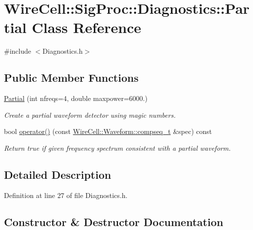 \hypertarget{class_wire_cell_1_1_sig_proc_1_1_diagnostics_1_1_partial}{}\section{Wire\+Cell\+:\+:Sig\+Proc\+:\+:Diagnostics\+:\+:Partial Class Reference}
\label{class_wire_cell_1_1_sig_proc_1_1_diagnostics_1_1_partial}


{\ttfamily \#include $<$Diagnostics.\+h$>$}

\subsection*{Public Member Functions}
\begin{DoxyCompactItemize}
\item 
\hyperlink{class_wire_cell_1_1_sig_proc_1_1_diagnostics_1_1_partial_a400cd1752f4d046aa963f5d9f00e0e1c}{Partial} (int nfreqs=4, double maxpower=6000.)
\begin{DoxyCompactList}\small\item\em Create a partial waveform detector using magic numbers. \end{DoxyCompactList}\item 
bool \hyperlink{class_wire_cell_1_1_sig_proc_1_1_diagnostics_1_1_partial_a59f6ea2384f9ca2b516ab25426ddb2d0}{operator()} (const \hyperlink{namespace_wire_cell_1_1_waveform_a7e4a8d371f774438bb360e7d1dcb583a}{Wire\+Cell\+::\+Waveform\+::compseq\+\_\+t} \&spec) const
\begin{DoxyCompactList}\small\item\em Return true if given frequency spectrum consistent with a partial waveform. \end{DoxyCompactList}\end{DoxyCompactItemize}


\subsection{Detailed Description}


Definition at line 27 of file Diagnostics.\+h.



\subsection{Constructor \& Destructor Documentation}
\mbox{\label{class_wire_cell_1_1_sig_proc_1_1_diagnostics_1_1_partial_a400cd1752f4d046aa963f5d9f00e0e1c}} 
